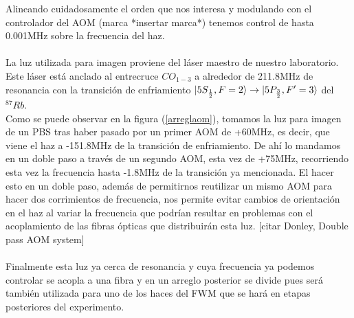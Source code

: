 \documentclass[12pt,twoside]{article}
\begin{document}
\newpage
Alineando cuidadosamente el orden que nos interesa y modulando con el controlador del AOM (marca *insertar marca*) tenemos control de hasta 0.001MHz sobre la frecuencia del haz. \\
\\
La luz utilizada para imagen proviene del láser maestro de nuestro laboratorio. Este láser está anclado al entrecruce $CO_{1-3}$ a alrededor de 211.8MHz de resonancia con la transición de enfriamiento $\ket{5S_{\frac{1}{2}},F=2} \rightarrow \ket{5P_{\frac{3}{2}},F'=3}$ del $^{87}Rb$. \\
Como se puede observar en la figura (\ref{arreglaom}), tomamos la luz para imagen de un PBS tras haber pasado por un primer AOM de +60MHz, es decir, que viene el haz a -151.8MHz de la transición de enfriamiento. De ahí lo mandamos en un doble paso a través de un segundo AOM, esta vez de +75MHz, recorriendo esta vez la frecuencia hasta -1.8MHz de la transición ya mencionada. El hacer esto en un doble paso, además de permitirnos reutilizar un mismo AOM para hacer dos corrimientos de frecuencia, nos permite evitar cambios de orientación en el haz al variar la frecuencia que podrían resultar en problemas con el acoplamiento de las fibras ópticas que distribuirán esta luz. [citar Donley, Double pass AOM system]\\
\\
Finalmente esta luz ya cerca de resonancia y cuya frecuencia ya podemos controlar se acopla a una fibra y en un arreglo posterior se divide pues será también utilizada para uno de los haces del FWM que se hará en etapas posteriores del experimento. 
\end{document}
